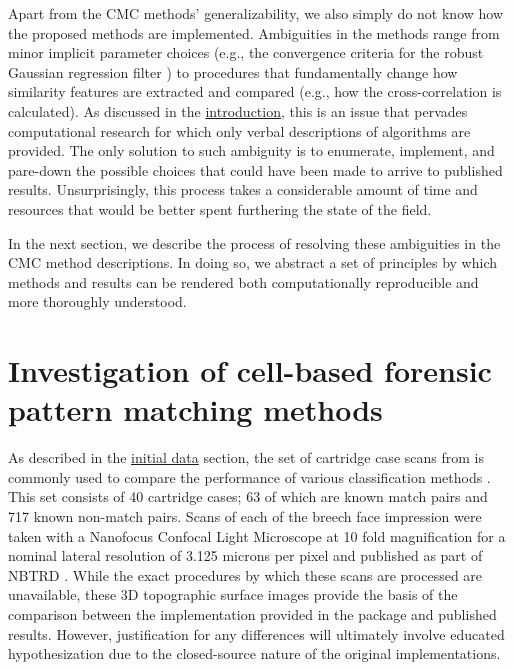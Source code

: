 Apart from the CMC methods' generalizability, we also simply do not know
how the proposed methods are implemented. Ambiguities in the methods
range from minor implicit parameter choices (e.g., the convergence
criteria for the robust Gaussian regression filter
\citep{brinkman_bodschwinna_2003}) to procedures that fundamentally
change how similarity features are extracted and compared (e.g., how the
cross-correlation is calculated). As discussed in the
\protect\hyperlink{intro}{introduction}, this is an issue that pervades
computational research for which only verbal descriptions of algorithms
are provided. The only solution to such ambiguity is to enumerate,
implement, and pare-down the possible choices that could have been made
to arrive to published results. Unsurprisingly, this process takes a
considerable amount of time and resources that would be better spent
furthering the state of the field.

In the next section, we describe the process of resolving these
ambiguities in the CMC method descriptions. In doing so, we abstract a
set of principles by which methods and results can be rendered both
computationally reproducible and more thoroughly understood.

\hypertarget{investigation}{%
\section{Investigation of cell-based forensic pattern matching
methods}\label{investigation}}

As described in the \protect\hyperlink{initialData}{initial data}
section, the set of cartridge case scans from
\citet{fadul_empirical_2011} is commonly used to compare the performance
of various classification methods
\citep{song_3d_2014, tong_improved_2015, chen_convergence_2017}. This
set consists of 40 cartridge cases; 63 of which are known match pairs
and 717 known non-match pairs. Scans of each of the breech face
impression were taken with a Nanofocus Confocal Light Microscope at 10
fold magnification for a nominal lateral resolution of 3.125 microns per
pixel and published as part of NBTRD \citep{nbtrd}. While the exact
procedures by which these scans are processed are unavailable, these 3D
topographic surface images provide the basis of the comparison between
the implementation provided in the  package and published
results. However, justification for any differences will ultimately
involve educated hypothesization due to the closed-source nature of the
original implementations.

